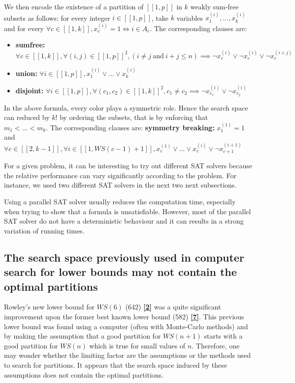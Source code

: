 We then encode the existence of a partition of \([\![1,p]\!]\) in \(k\) weakly sum-free subsets as follows: for every
integer
\(i \in [\![1,p]\!]\), take \(k\) variables \(x^{(i)}_{1}, ..., x^{(i)}_{k}\) and for every \(\forall c \in [\![1,k]\!],
x^{(i)}_c = 1 \iff i \in A_c\).
The corresponding clauses are:

\begin{itemize}
\item \textbf{sumfree:} \(\forall c \in [\![1,k]\!], \forall (i, j) \in [\![1,p]\!]^2, (i \neq j ~ \text{and} ~ i + j
\leq n) \implies \lnot x^{(i)}_c
\lor  \lnot x^{(i)}_c \lor \lnot x^{(i+j)}_c\)
\item \textbf{union:} \(\forall i \in [\![1,p]\!], x^{(i)}_1 \lor ... \lor x^{(i)}_k\)
\item \textbf{disjoint:} \(\forall i \in [\![1,p]\!],\forall (c_1, c_2) \in [\![1,k]\!]^2, c_1 \neq c_2 \implies \neg
x^{(i)}_{c_1} \lor \neg x^{(i)}_{c_2}\)
\end{itemize}

In the above formula, every color plays a symmetric role. Hence the search space can reduced by \(k!\) by ordering the
subsets, that is by
enforcing that \(m_1 < ... < m_k\). The corresponding clauses are: \linebreak
\textbf{symmetry breaking:} \(x^{(1)}_1 = 1\) and \(\forall c \in [\![2,k-1]\!], \forall i \in [\![1,WS(c - 1)+1]\!],
x^{(1)}_c \lor ... \lor x^{(i)}_c \lor \neg x^{(i+1)}_{c+1}\)

\begin{remark}
For a given problem, it can be interesting to try out different SAT solvers because the relative performance can vary
significantly according to the problem.
For instance, we used two different SAT solvers in the next two next subsections.
\end{remark}

\begin{remark}
Using a parallel SAT solver usually reduces the computation time, especially when trying to show that a formula is
unsatisfiable. However, most of the
parallel SAT solver do not have a deterministic behaviour and it can results in a strong variation of running times.
\end{remark}


\subsection{The search space previously used in computer search for lower bounds may not contain the optimal partitions}
Rowley's new lower bound for \(WS(6)\) (642) \hyperlink{label2}{\textbf{[2]}} was a quite significant improvement upon
the former
best known lower bound (582) \hyperlink{label7}{\textbf{[7]}}. This previous lower bound was found using a computer
(often with Monte-Carlo methods) and by making the
assumption that a good partition for \(WS(n+1)\) starts with a good partition for \(WS(n)\) which is true for small
values of \(n\).
Therefore, one may wonder whether the limiting factor are the assumptions or the methods used to search for partitions.
It appears that the search space
induced by these assumptions does not contain the optimal partitions.

